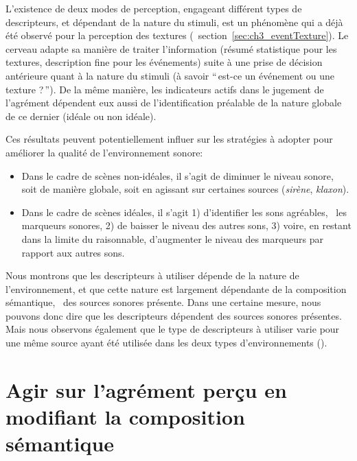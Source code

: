 L'existence de deux modes de perception, engageant différent types de descripteurs, et dépendant de la nature du stimuli, est un phénomène qui a déjà été observé pour la perception des textures (\cf~section~\ref{sec:ch3_eventTexture}). Le cerveau adapte sa manière de traiter l'information (résumé statistique pour les textures, description fine pour les événements) suite à une prise de décision antérieure quant à la nature du stimuli (à savoir ``\,est-ce un événement ou une texture ?\,''). De la même manière, les indicateurs actifs dans le jugement de l'agrément dépendent eux aussi de l'identification préalable de la nature globale  de ce dernier (idéale ou non idéale).

Ces résultats peuvent potentiellement influer sur les stratégies à adopter pour améliorer la qualité de l’environnement sonore:

\begin{itemize}
\item Dans le cadre de scènes non-idéales, il s'agit de diminuer le niveau sonore, soit de manière globale, soit en agissant sur certaines sources (\emph{sirène}, \emph{klaxon}). 
\item Dans le cadre de scènes idéales, il s'agit 1) d'identifier les sons agréables, \ie~les marqueurs sonores, 2) de baisser le niveau des autres sons, 3) voire, en restant dans la limite du raisonnable, d'augmenter le niveau des marqueurs par rapport aux autres sons.
\end{itemize}

Nous montrons que les descripteurs à utiliser dépende de la nature de l'environnement, et que cette nature est largement dépendante de la composition sémantique, \ie~des sources sonores présente. Dans une certaine mesure, nous pouvons donc dire que les descripteurs dépendent des sources sonores présentes. Mais nous observons également que le type de descripteurs à utiliser varie pour une même source ayant été utilisée  dans les deux types d'environnements (). \\


\section{Agir sur l'agrément perçu en modifiant la composition sémantique}
\label{sec:xp3}

